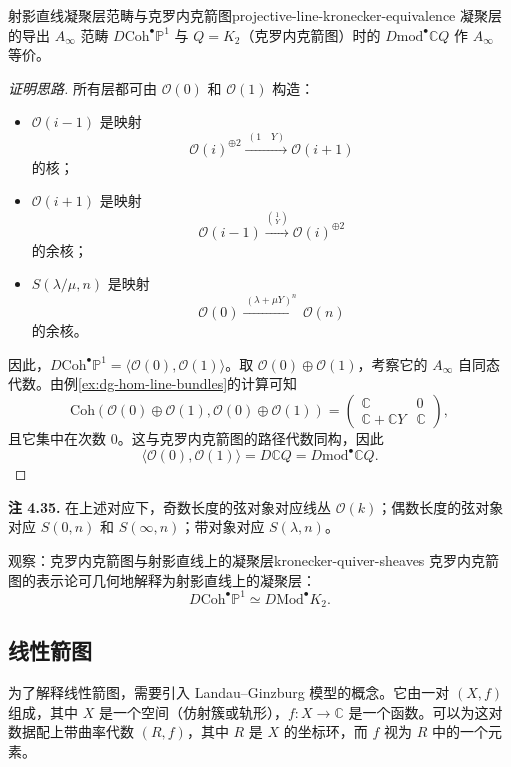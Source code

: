 \begin{theorem}{射影直线凝聚层范畴与克罗内克箭图}{projective-line-kronecker-equivalence}
凝聚层的导出 $A_\infty$ 范畴 $D\mathrm{Coh}^\bullet\mathbb P^1$ 与 $Q=K_2$（克罗内克箭图）时的 $D\mathrm{mod}^\bullet\mathbb C Q$ 作 $A_\infty$ 等价。
\end{theorem}
\begin{proof}[证明思路]
所有层都可由 $\mathcal O(0)$ 和 $\mathcal O(1)$ 构造：
\begin{itemize}
  \item $\mathcal O(i-1)$ 是映射
  \[
    \mathcal O(i)^{\oplus2}\xrightarrow{\ (1\quad Y)\ }\mathcal O(i+1)
  \]
  的核；
  \item $\mathcal O(i+1)$ 是映射
  \[
    \mathcal O(i-1)\xrightarrow{\binom{1}{Y}}\mathcal O(i)^{\oplus2}
  \]
  的余核；
  \item $S(\lambda/\mu,n)$ 是映射
  \[
    \mathcal O(0)\xrightarrow{\ (\lambda+\mu Y)^n\ }\mathcal O(n)
  \]
  的余核。
\end{itemize}
因此，$D\mathrm{Coh}^\bullet\mathbb P^1=\langle\mathcal O(0),\mathcal O(1)\rangle$。取 $\mathcal O(0)\oplus\mathcal O(1)$，考察它的 $A_\infty$ 自同态代数。由例\ref{ex:dg-hom-line-bundles}的计算可知
\[
  \mathrm{Coh}(\mathcal O(0)\oplus\mathcal O(1),
  \mathcal O(0)\oplus\mathcal O(1))
  =\begin{pmatrix}
    \mathbb C&0\\
    \mathbb C+\mathbb CY&\mathbb C
  \end{pmatrix},
\]
且它集中在次数 $0$。这与克罗内克箭图的路径代数同构，因此
\[
  \langle\mathcal O(0),\mathcal O(1)\rangle
  =D\mathbb C Q=D\mathrm{mod}^\bullet\mathbb C Q.
\]
\end{proof}

\begin{note}\label{note:kronecker-sheaf-identification}
\textbf{注 4.35.} 在上述对应下，奇数长度的弦对象对应线丛 $\mathcal O(k)$；偶数长度的弦对象对应 $S(0,n)$ 和 $S(\infty,n)$；带对象对应 $S(\lambda,n)$。
\end{note}

\begin{proposition}{观察：克罗内克箭图与射影直线上的凝聚层}{kronecker-quiver-sheaves}
克罗内克箭图的表示论可几何地解释为射影直线上的凝聚层：
\[
  D\mathrm{Coh}^\bullet\mathbb P^1
  \simeq D\mathrm{Mod}^\bullet K_2.
\]
\end{proposition}

\subsection{线性箭图}\label{subsec:linear-quiver-sheaves}
为了解释线性箭图，需要引入 Landau–Ginzburg 模型的概念。它由一对 $(X,f)$ 组成，其中 $X$ 是一个空间（仿射簇或轨形），$f\colon X\to\mathbb C$ 是一个函数。可以为这对数据配上带曲率代数 $(R,f)$，其中 $R$ 是 $X$ 的坐标环，而 $f$ 视为 $R$ 中的一个元素。

